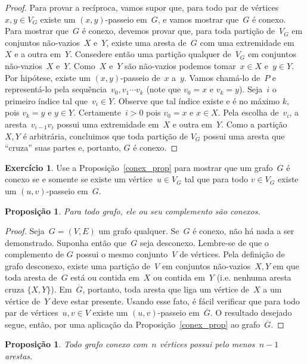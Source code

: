 \documentclass[12pt, a4paper]{article}
\newtheorem{prop}[teor]{Proposição}
\theoremstyle{definition}
\newtheorem{exer}{Exercício}
\begin{document}
\begin{proof}
  Para provar a recíproca, vamos supor que, para todo par de
  vértices~$x,y \in V_G$ existe um $(x,y)$-passeio em~$G$, e vamos
  mostrar que~$G$ é conexo. Para mostrar que~$G$ é conexo, devemos
  provar que, para toda partição de~$V_G$ em conjuntos não-vazios~$X$ e~$Y$, existe uma aresta de~$G$ com uma extremidade em~$X$ e a outra em~$Y$. Consedere então uma partição qualquer de~$V_G$ em conjuntos
  não-vazios~$X$ e~$Y$. Como~$X$ e~$Y$ são não-vazios podemos tomar~$x
  \in X$ e~$y \in Y$.  Por hipótese, existe um $(x,y)$-passeio de~$x$
  a~$y$. Vamos chamá-lo de~$P$ e representá-lo pela sequência~$v_0, v_1 \cdots v_k$ (note que $v_0 = x$ e $v_k = y$). Seja~$i$ o primeiro índice tal que~$v_i
  \in Y$. Observe que tal índice existe e é no máximo $k$, pois $v_k = y$ e $y \in Y$. Certamente~$i > 0$ pois $v_0 = x$ e $x \in X$. Pela escolha de~$v_i$, a aresta~$v_{i-1}v_{i}$ possui uma extremidade em~$X$ e outra em~$Y$. Como a partição~$X,Y$ é arbitrária, concluimos que toda partição de $V_G$ possui uma aresta que ``cruza'' suas partes e, portanto, $G$ é conexo.
\end{proof}

\begin{exer}
Use a Proposição~\ref{conex_prop} para mostrar que um grafo~$G$ é conexo se e somente se existe um vértice~$u \in V_G$ tal que para todo $v \in V_G$ existe um $(u,v)$-passeio em~$G$.
\end{exer}

\begin{prop}
  Para todo grafo, ele ou seu complemento são conexos.
\end{prop}

\begin{proof} 
Seja~$G = (V,E)$ um grafo qualquer. Se~$G$ é conexo, não há nada a ser demonstrado. Suponha então que~$G$ seja desconexo. Lembre-se de que o complemento de $G$ possui o mesmo conjunto~$V$ de vértices. Pela definição de grafo desconexo, existe uma partição de~$V$ em conjuntos não-vazios~$X,Y$ em que toda aresta de~$G$ está ou contida em~$X$ ou contida em~$Y$ (i.e. nenhuma aresta cruza $\{X, Y\}$). Em~$\overline{G}$, portanto, toda aresta que liga um vértice de~$X$ a um vértice de~$Y$ deve estar presente. Usando esse fato, é fácil verificar que para todo par de vértices~$u,v \in V$ existe um $(u,v)$-passeio em~$\overline{G}$. O resultado desejado segue, então, por uma aplicação da Proposição~\ref{conex_prop} ao grafo~$\overline{G}$.
\end{proof}


\begin{prop}
  Todo grafo conexo com~$n$ vértices possui pelo menos~$n-1$ arestas.
\end{prop}
\end{document}
